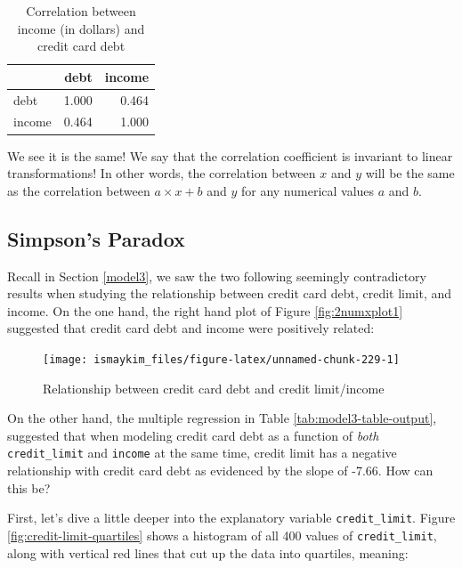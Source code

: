\documentclass[12pt, krantz2,]{krantz}
\begin{document}
\begin{table}[H]

\caption{\label{tab:cor-credit-2}Correlation between income (in dollars) and credit card debt}
\centering
\fontsize{10}{12}\selectfont
\begin{tabular}{lrr}
\toprule
  & debt & income\\
\midrule
debt & 1.000 & 0.464\\
income & 0.464 & 1.000\\
\bottomrule
\end{tabular}
\end{table}

We see it is the same! We say that the correlation coefficient is invariant to linear transformations! In other words, the correlation between \(x\) and \(y\) will be the same as the correlation between \(a\times x + b\) and \(y\) for any numerical values \(a\) and \(b\).

\hypertarget{simpsonsparadox}{%
\subsection{Simpson's Paradox}\label{simpsonsparadox}}

Recall in Section \ref{model3}, we saw the two following seemingly contradictory results when studying the relationship between credit card debt, credit limit, and income. On the one hand, the right hand plot of Figure \ref{fig:2numxplot1} suggested that credit card debt and income were positively related:

\begin{figure}

{\centering \texttt{[image: ismaykim\_files/figure-latex/unnamed-chunk-229-1]} 

}

\caption{Relationship between credit card debt and credit limit/income}\label{fig:unnamed-chunk-229}
\end{figure}

On the other hand, the multiple regression in Table \ref{tab:model3-table-output}, suggested that when modeling credit card debt as a function of \emph{both} \texttt{credit\_limit} and \texttt{income} at the same time, credit limit has a negative relationship with credit card debt as evidenced by the slope of -7.66. How can this be?

First, let's dive a little deeper into the explanatory variable \texttt{credit\_limit}. Figure \ref{fig:credit-limit-quartiles} shows a histogram of all 400 values of \texttt{credit\_limit}, along with vertical red lines that cut up the data into quartiles, meaning:
\end{document}
